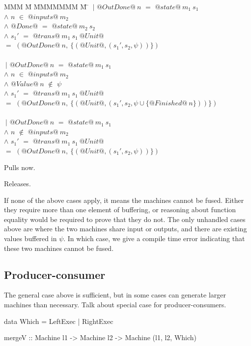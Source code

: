 \begin{tabbing}
MMM \= M \= MMMMMMM \= M \=\kill
 \> $~|$ \> $@OutDone@~n$ \> $=$ \> $@state@~m_1~s_1$ \\
 \> $\wedge$ \> $n$      \> $\in$ \> $@inputs@~m_2$ \\
 \> $\wedge$ \> $@Done@$ \> $=$ \> $@state@~m_2~s_2$ \\
 \> $\wedge$ \> $s_1'$     \> $=$ \> $@trans@~m_1~s_1~@Unit@$ \\
 \> $=$ \> $(@OutDone@~n,~\{(@Unit@, (s_1',s_2,\psi))\})$ \\
 \\
 \> $~|$ \> $@OutDone@~n$ \> $=$ \> $@state@~m_1~s_1$ \\
 \> $\wedge$ \> $n$      \> $\in$ \> $@inputs@~m_2$ \\
 \> $\wedge$ \> $@Value@~n$ \> $\not\in$ \> $\psi$ \\
 \> $\wedge$ \> $s_1'$     \> $=$ \> $@trans@~m_1~s_1~@Unit@$ \\
 \> $=$ \> $(@OutDone@~n,~\{(@Unit@, (s_1',s_2,\psi \cup \{@Finished@~n\}))\})$ \\
 \\
 \> $~|$ \> $@OutDone@~n$ \> $=$ \> $@state@~m_1~s_1$ \\
 \> $\wedge$ \> $n$      \> $\not\in$ \> $@inputs@~m_2$ \\
 \> $\wedge$ \> $s_1'$     \> $=$ \> $@trans@~m_1~s_1~@Unit@$ \\
 \> $=$ \> $(@OutDone@~n,~\{(@Unit@, (s_1',s_2,\psi))\})$ \\
\end{tabbing}

Pulls now.

Releases.

If none of the above cases apply, it means the machines cannot be fused.
Either they require more than one element of buffering, or reasoning about function equality would be required to prove that they do not.
The only unhandled cases above are where the two machines share input or outputs, and there are existing values buffered in $\psi$.
In which case, we give a compile time error indicating that these two machines cannot be fused.




\subsection{Producer-consumer}
The general case above is sufficient, but in some cases can generate larger machines than necessary.
Talk about special case for producer-consumers.

\begin{code}
data Which = LeftExec | RightExec

mergeV :: Machine l1 -> Machine l2
       -> Machine (l1, l2, Which)
\end{code}

